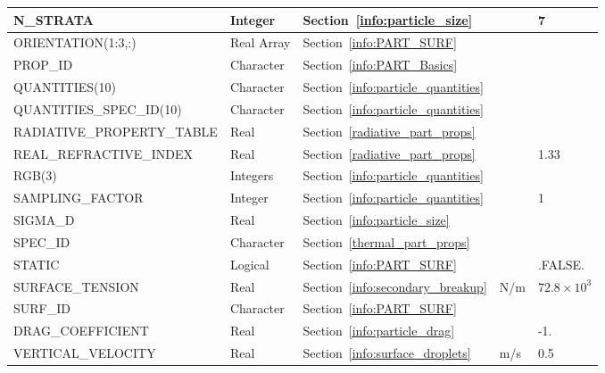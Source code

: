 \documentclass[11pt]{book}
\begin{document}
\begin{longtable}{@{\extracolsep{\fill}}|l|l|l|l|l|}
{\ct N\_STRATA}                     & Integer         & Section~\ref{info:particle_size}        &           & 7             \\ \hline
{\ct ORIENTATION(1:3,:)}            & Real Array      & Section~\ref{info:PART_SURF}            &           &               \\ \hline
{\ct PROP\_ID}                      & Character       & Section~\ref{info:PART_Basics}          &           &               \\ \hline
{\ct QUANTITIES(10)}                & Character       & Section~\ref{info:particle_quantities}  &           &               \\ \hline
{\ct QUANTITIES\_SPEC\_ID(10)}      & Character       & Section~\ref{info:particle_quantities}  &           &               \\ \hline
{\ct RADIATIVE\_PROPERTY\_TABLE}    & Real            & Section~\ref{radiative_part_props}      &           &               \\ \hline
{\ct REAL\_REFRACTIVE\_INDEX}       & Real            & Section~\ref{radiative_part_props}      &           & 1.33          \\ \hline
{\ct RGB(3)}                        & Integers        & Section~\ref{info:particle_quantities}  &           &               \\ \hline
{\ct SAMPLING\_FACTOR}              & Integer         & Section~\ref{info:particle_quantities}  &           & 1             \\ \hline
{\ct SIGMA\_D}                      & Real            & Section~\ref{info:particle_size}        &           &               \\ \hline
{\ct SPEC\_ID}                      & Character       & Section~\ref{thermal_part_props}        &           &               \\ \hline
{\ct STATIC}                        & Logical         & Section~\ref{info:PART_SURF}            &           & {\ct .FALSE.} \\ \hline
{\ct SURFACE\_TENSION}              & Real            & Section~\ref{info:secondary_breakup}    &   N/m     & $72.8 \times 10^3$  \\ \hline
{\ct SURF\_ID}                      & Character       & Section~\ref{info:PART_SURF}            &           &               \\ \hline
{\ct DRAG\_COEFFICIENT}             & Real            & Section~\ref{info:particle_drag}        &           & -1.           \\ \hline
{\ct VERTICAL\_VELOCITY}            & Real            & Section~\ref{info:surface_droplets}     & m/s       &  0.5          \\ \hline
\end{longtable}
\end{document}
